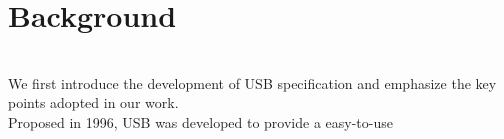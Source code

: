 \section{Background}
\label{sec:background}
\noindent{}\\
We first introduce the development of USB specification and emphasize the key points adopted in our work.
\\
Proposed in 1996, USB\cite{usb01} was developed to provide a easy-to-use

\\
\\
\\
\\